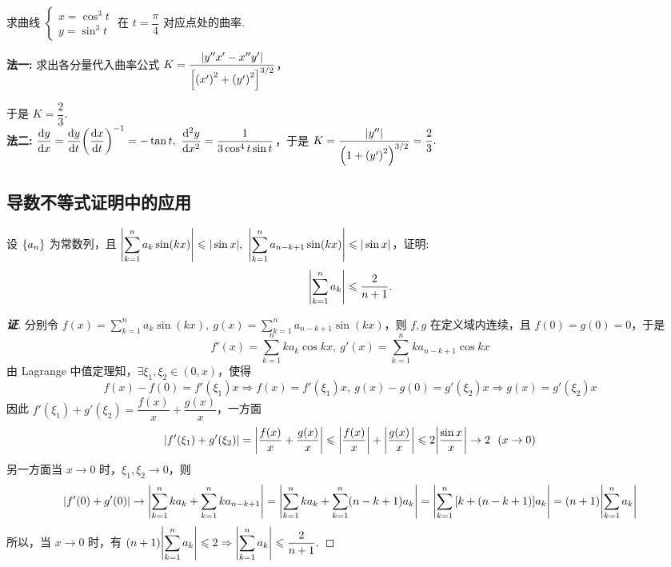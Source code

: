 \begin{example}[2018 数二]
    求曲线 $\begin{cases}
            x=\cos^3t \\y=\sin^3t
        \end{cases}$ 在 $t=\dfrac{\pi}{4}$ 对应点处的曲率.
\end{example}
\begin{solution}
    \textbf{法一: }求出各分量代入曲率公式 $K=\dfrac{|y''x'-x''y'|}{\qty[\qty(x')^2+\qty(y')^2]^{3/2}}$，
    于是 $K=\dfrac{2}{3}.$\\
    \textbf{法二: }$\displaystyle \dv{y}{x}=\dv{y}{t}\qty(\dv{x}{t})^{-1}=-\tan t,~\dv[2]{y}{x}=\dfrac{1}{3\cos ^4t\sin t}$，于是 $K=\dfrac{|y''|}{\qty(1+\qty(y')^2)^{3/2}}=\dfrac{2}{3}.$
\end{solution}

\subsection{导数不等式证明中的应用}

\begin{example}
    设 $\qty{a_n}$ 为常数列，且 $\displaystyle\qty|\sum_{k=1}^{n}a_k\sin(kx)|\leqslant |\sin x|,~\qty|\sum_{k=1}^{n}a_{n-k+1}\sin(kx)|\leqslant |\sin x|$，证明: $$\displaystyle \qty|\sum_{k=1}^{n}a_k|\leqslant \dfrac{2}{n+1}.$$
\end{example}
\begin{proof}[{\songti \textbf{证}}]
    分别令 $\displaystyle f(x)=\sum_{k=1}^{n}a_k\sin(kx),~g(x)=\sum_{k=1}^{n}a_{n-k+1}\sin(kx)$，则 $f,g$ 在定义域内连续，且 $f(0)=g(0)=0$，于是
    $$f'(x)=\sum_{k=1}^{n}ka_k\cos kx,~g'(x)=\sum_{k=1}^{n}ka_{n-k+1}\cos kx$$
    由 Lagrange 中值定理知，$\exists\xi_1,\xi_2\in(0,x)$，使得
    $$f(x)-f(0)=f'(\xi_1)x\Rightarrow f(x)=f'(\xi_1)x,~g(x)-g(0)=g'(\xi_2)x\Rightarrow g(x)=g'(\xi_2)x$$
    因此 $f'(\xi_1)+g'(\xi_2)=\dfrac{f(x)}{x}+\dfrac{g(x)}{x}$，一方面
    $$\qty|f'(\xi_1)+g'(\xi_2)|=\qty|\dfrac{f(x)}{x}+\dfrac{g(x)}{x}|\leqslant \qty|\dfrac{f(x)}{x}|+\qty|\dfrac{g(x)}{x}|\leqslant 2\qty|\dfrac{\sin x}{x}|\to 2~~(x\to0)$$
    另一方面当 $x\to0$ 时，$\xi_1,\xi_2\to0$，则
    $$\qty|f'(0)+g'(0)|\to\qty|\sum_{k=1}^{n}ka_k+\sum_{k=1}^{n}ka_{n-k+1}|=\qty|\sum_{k=1}^{n}ka_k+\sum_{k=1}^{n}(n-k+1)a_k|=\qty|\sum_{k=1}^{n}\qty[k+(n-k+1)]a_k|=(n+1)\qty|\sum_{k=1}^{n}a_k|$$
    所以，当 $x\to0$ 时，有 $\displaystyle (n+1)\qty|\sum_{k=1}^{n}a_k|\leqslant 2\Rightarrow \qty|\sum_{k=1}^{n}a_k|\leqslant \dfrac{2}{n+1}.$
\end{proof}
